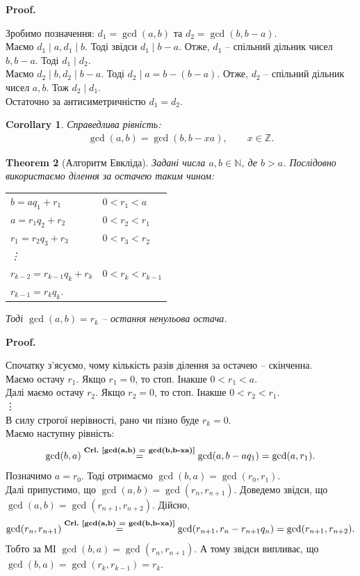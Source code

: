 \documentclass[a4paper, 10pt]{article}
\makeatletter
\theoremstyle{theoremdd}
\newtheorem{theorem}{Theorem}[subsection]
\theoremstyle{theoremdd}
\theoremstyle{theoremdd}
\theoremstyle{theoremdd}
\theoremstyle{theoremdd}
\theoremstyle{theoremdd}
\theoremstyle{theoremdd}
\theoremstyle{theoremdd}
\newtheorem{corollary}[theorem]{Corollary}
\renewenvironment{proof}[1][Proof.\\]{\par
\pushQED{\hfill \qed}%
\normalfont \topsep6\p@\@plus6\p@\relax
\trivlist
\item\relax
{\bfseries
#1\@addpunct{.}}\hspace\labelsep\ignorespaces
}{%
\popQED\endtrivlist\@endpefalse
}
\newcommand\crlref[1]{\textbf{Crl.~\ref{#1}}}
\makeatother
\begin{document}
\begin{proof}
Зробимо позначення: $d_1 = \gcd(a,b)$ та $d_2 = \gcd(b,b-a)$.\\
Маємо $d_1 \mid a, d_1 \mid b$. Тоді звідси $d_1 \mid b -a$. Отже, $d_1$ -- спільний дільник чисел $b, b-a$. Тоді $d_1 \mid d_2$.\\
Маємо $d_2 \mid b, d_2 \mid b-a$. Тоді $d_2 \mid a = b-(b-a)$. Отже, $d_2$ -- спільний дільник чисел $a,b$. Тож $d_2 \mid d_1$.\\
Остаточно за антисиметричністю $d_1 = d_2$.
\end{proof}

\begin{corollary}
\label{gcd(a,b) = gcd(b,b-xa)}
Справедлива рівність:
\begin{align*}
\gcd(a,b) = \gcd(b, b-xa), \qquad x \in \mathbb{Z}.
\end{align*}
\end{corollary}

\begin{theorem}[Алгоритм Евкліда]
Задані числа $a,b \in \mathbb{N}$, де $b > a$. Послідовно використаємо ділення за остачею таким чином:
\begin{center}
\begin{tabular}{ll}
$b = aq_1 + r_1$ & $0 < r_1 < a$ \\
$a = r_1q_2 + r_2$ & $0 < r_2 < r_1$ \\
$r_1 = r_2q_3 + r_3$ & $0 < r_3 < r_2$ \\
\vdots \\
$r_{k-2} = r_{k-1}q_k + r_k$ & $0 < r_k < r_{k-1}$ \\
$r_{k-1} = r_k q_k$. &
\end{tabular}
\end{center}
Тоді $\gcd(a,b) = r_k$ -- остання ненульова остача.
\end{theorem}

\begin{proof}
Спочатку з'ясуємо, чому кількість разів ділення за остачею -- скінченна.\\
Маємо остачу $r_1$. Якщо $r_1 = 0$, то стоп. Інакше $0 < r_1 < a$.\\
Далі маємо остачу $r_2$. Якщо $r_2 = 0$, то стоп. Інакше $0 < r_2 < r_1$.\\
\vdots \\
В силу строгої нерівності, рано чи пізно буде $r_k = 0$.
\bigskip \\
Маємо наступну рівність: \[
\gcd(b,a) \overset{\crlref{gcd(a,b) = gcd(b,b-xa)}}{=} \gcd(a,b-aq_1) = \gcd(a,r_1).
\]
Позначимо $a = r_0$. Тоді отримаємо $\gcd(b,a) = \gcd(r_0,r_1)$.\\
Далі припустимо, що $\gcd(a,b) = \gcd(r_n,r_{n+1})$. Доведемо звідси, що $\gcd(a,b) = \gcd(r_{n+1},r_{n+2})$. Дійсно, \[
\gcd(r_{n},r_{n+1}) \overset{\crlref{gcd(a,b) = gcd(b,b-xa)}}{=} \gcd(r_{n+1}, r_n - r_{n+1}q_n) = \gcd(r_{n+1}, r_{n+2}).
\]
Тобто за МІ $\gcd(b,a) = \gcd(r_{n},r_{n+1})$. А тому звідси випливає, що $\gcd(b,a) = \gcd(r_k,r_{k-1}) = r_k$.
\end{proof}
\end{document}

